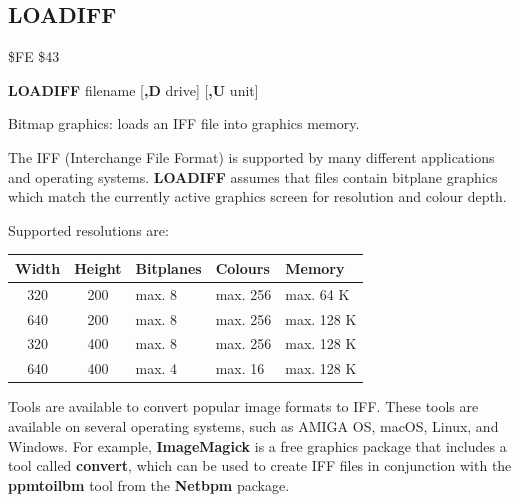 
\newpage
\subsection{LOADIFF}
\begin{description}[leftmargin=2cm,style=nextline]
\item [Token:] \$FE \$43
\item [Format:] {\bf LOADIFF} filename [{\bf,D} drive] [{\bf,U} unit]
\item [Usage:]
   Bitmap graphics: loads an IFF file into graphics memory.

   The IFF (Interchange File Format) is supported by many different
   applications and operating systems. {\bf LOADIFF} assumes that files
   contain bitplane graphics which match the currently active graphics screen
   for resolution and colour depth.

   Supported resolutions are:
\begin{center}
\setlength{\tabcolsep}{1mm}
\begin{tabular}{|c|c|l|l|l|}
\hline
{\bf Width}             & {\bf Height} & {\bf Bitplanes} & {\bf Colours} & {\bf Memory} \\
\hline
320                     &  200    & max. 8     & max. 256 & max. 64 K \\
640                     &  200    & max. 8     & max. 256 & max. 128 K \\
320                     &  400    & max. 8     & max. 256 & max. 128 K \\
640                     &  400    & max. 4     & max.  16 & max. 128 K \\
\hline
\end{tabular}
\end{center}

   \filenamedefinition

   \drivedefinition

   \unitdefinition

\item [Remarks:]
   Tools are available to convert popular image formats to IFF. These tools
   are available on several operating systems, such as AMIGA OS, macOS, Linux, and Windows.
   For example, {\bf ImageMagick} is a free graphics package that includes a tool
   called {\bf convert}, which can be used to create IFF files in conjunction
   with the {\bf ppmtoilbm} tool from the {\bf Netbpm} package.


\end{description}
